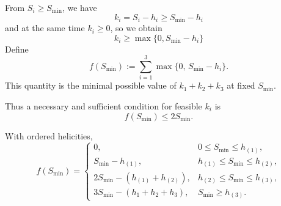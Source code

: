 \documentclass[12pt]{article}
\begin{document}
From $S_i\ge S_{\min}$, we have
\begin{equation}
   k_i=S_i-h_i\ge S_{\min}-h_i
\end{equation}
and at the same time $k_i\ge0$, so we obtain
\begin{equation}
   k_i\ge \max\{0,S_{\min}-h_i\}
\end{equation}
Define
\begin{equation}
f(S_{\min}) := \sum_{i=1}^3 \max\{0,\,S_{\min}-h_i\}.
\end{equation}
This quantity is the minimal possible value of $k_1+k_2+k_3$ at fixed $S_{\min}$.  

Thus a necessary and sufficient condition for feasible $k_i$ is
\begin{equation}\label{eq:f-inequality}
f(S_{\min}) \le 2 S_{\min}.
\end{equation}

With ordered helicities,
\begin{equation}
f(S_{\min})=
\begin{cases}
0, & 0\le S_{\min}\le h_{(1)}, \\[4pt]
S_{\min}-h_{(1)}, & h_{(1)}\le S_{\min}\le h_{(2)}, \\[4pt]
2 S_{\min}-(h_{(1)}+h_{(2)}), & h_{(2)}\le S_{\min}\le h_{(3)}, \\[4pt]
3 S_{\min}-(h_1+h_2+h_3), & S_{\min}\ge h_{(3)}.
\end{cases}
\end{equation}
\end{document}
